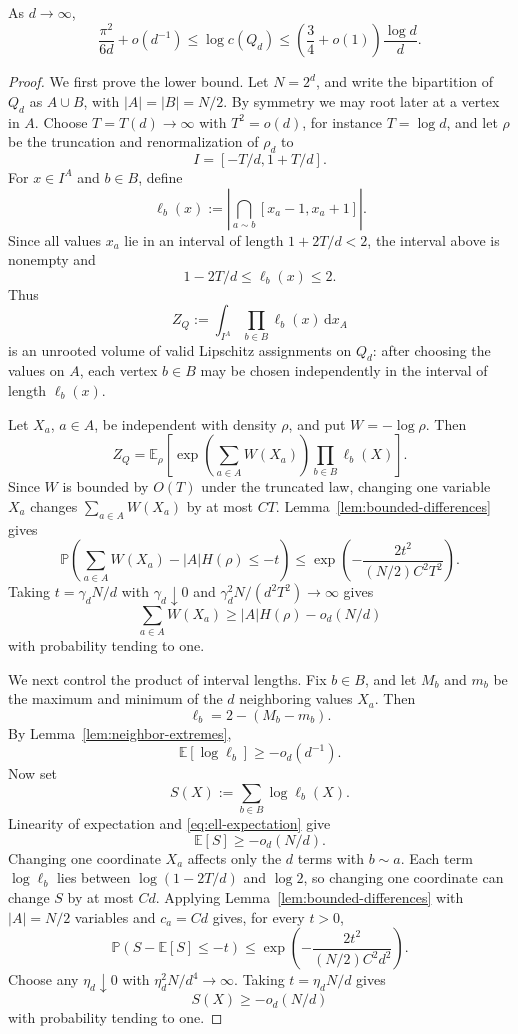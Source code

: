 \documentclass[10pt,a4paper]{amsart}
\newcommand{\EE}{\mathbb{E}}
\newcommand{\PP}{\mathbb{P}}
\newcommand{\dd}{\,\mathrm{d}}
\begin{document}
\begin{theorem}\label{thm:hypercube}
As $d\to\infty$,
\[
  \frac{\pi^2}{6d}+o(d^{-1})\le \log c(Q_d)
  \le \left(\frac34+o(1)\right)\frac{\log d}{d}.
\]
\end{theorem}

\begin{proof}
We first prove the lower bound.  Let $N=2^d$, and write the bipartition of $Q_d$ as $A\cup B$, with $|A|=|B|=N/2$.  By symmetry we may root later at a vertex in $A$.  Choose $T=T(d)\to\infty$ with $T^2=o(d)$, for instance $T=\log d$, and let $\rho$ be the truncation and renormalization of $\rho_d$ to
\[
  I=[-T/d,1+T/d].
\]
For $x\in I^A$ and $b\in B$, define
\[
  \ell_b(x):=\left|\bigcap_{a\sim b}[x_a-1,x_a+1]\right|.
\]
Since all values $x_a$ lie in an interval of length $1+2T/d<2$, the interval above is nonempty and
\[
  1-2T/d\le \ell_b(x)\le 2.
\]
Thus
\[
  Z_Q:=\int_{I^A}\prod_{b\in B}\ell_b(x)\dd x_A
\]
is an unrooted volume of valid Lipschitz assignments on $Q_d$: after choosing the values on $A$, each vertex $b\in B$ may be chosen independently in the interval of length $\ell_b(x)$.

\bigskip
\noindent
Let $X_a$, $a\in A$, be independent with density $\rho$, and put $W=-\log\rho$.  Then
\[
  Z_Q=\EE_\rho\left[\exp\left(\sum_{a\in A}W(X_a)\right)
  \prod_{b\in B}\ell_b(X)\right].
\]
Since $W$ is bounded by $O(T)$ under the truncated law, changing one variable $X_a$ changes $\sum_{a\in A}W(X_a)$ by at most $CT$.  Lemma~\ref{lem:bounded-differences} gives
\[
  \PP\left(\sum_{a\in A}W(X_a)-|A|H(\rho)\le -t\right)
  \le \exp\left(-\frac{2t^2}{(N/2)C^2T^2}\right).
\]
Taking $t=\gamma_d N/d$ with $\gamma_d\downarrow0$ and $\gamma_d^2N/(d^2T^2)\to\infty$ gives
\begin{equation}\label{eq:Q-W-conc}
  \sum_{a\in A}W(X_a)
  \ge |A|H(\rho)-o_d(N/d)
\end{equation}
with probability tending to one.

\bigskip
\noindent
We next control the product of interval lengths.  Fix $b\in B$, and let $M_b$ and $m_b$ be the maximum and minimum of the $d$ neighboring values $X_a$.  Then
\[
  \ell_b=2-(M_b-m_b).
\]
By Lemma~\ref{lem:neighbor-extremes},
\begin{equation}\label{eq:ell-expectation}
  \EE\left[\log\ell_b\right]\ge -o_d(d^{-1}).
\end{equation}
Now set
\[
  S(X):=\sum_{b\in B}\log\ell_b(X).
\]
Linearity of expectation and \eqref{eq:ell-expectation} give
\[
  \EE \left[S\right]\ge -o_d(N/d).
\]
Changing one coordinate $X_a$ affects only the $d$ terms with $b\sim a$.  Each term $\log\ell_b$ lies between $\log(1-2T/d)$ and $\log 2$, so changing one coordinate can change $S$ by at most $C d$.  Applying Lemma~\ref{lem:bounded-differences} with $|A|=N/2$ variables and $c_a=Cd$ gives, for every $t>0$,
\[
  \PP(S-\EE \left[S\right]\le -t)
  \le \exp\left(-\frac{2t^2}{(N/2)C^2d^2}\right).
\]
Choose any $\eta_d\downarrow0$ with $\eta_d^2N/d^4\to\infty$.  Taking $t=\eta_d N/d$ gives
\begin{equation}\label{eq:Q-length-conc}
  S(X)\ge -o_d(N/d)
\end{equation}
with probability tending to one.


\end{proof}
\end{document}

